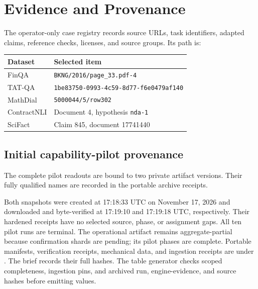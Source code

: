 \section{Evidence and Provenance}
\label{app:evidence}
The operator-only case registry records source URLs, task identifiers, adapted
claims, reference checks, licenses, and source groups. Its path is:
\begin{quote}\small
{}
\end{quote}
\begin{center}\small
\begin{tabular}{@{}l p{}@{}}
\toprule Dataset & Selected item\\
\midrule
FinQA & \texttt{BKNG/2016/page\_33.pdf-4}\\
TAT-QA & \nolinkurl{1be83750-0993-4c59-8d77-f6e0479af140}\\
MathDial & \texttt{5000044/5/row302}\\
ContractNLI & Document 4, hypothesis \texttt{nda-1}\\
SciFact & Claim 845, document 17741440\\
\bottomrule
\end{tabular}
\end{center}
\subsection{Initial capability-pilot provenance}
\label{app:pilot-locators}
The complete pilot readouts are bound to two private artifact versions. Their
fully qualified names are recorded in the portable archive receipts.
\begin{quote}\small
{}
\par\medskip
{}
\end{quote}
Both snapshots were created at 17:18:33 UTC on November 17, 2026 and downloaded
and byte-verified at 17:19:10 and 17:19:18 UTC, respectively. Their hardened
receipts have no selected source, phase, or assignment gaps. All ten pilot runs
are terminal. The operational artifact remains aggregate-partial because
confirmation shards are pending; its pilot phases are complete. Portable
manifests, verification receipts, mechanical data, and ingestion receipts are
under . The brief records their full
hashes. The table generator checks scoped completeness, ingestion pins, and
archived run, engine-evidence, and source hashes before emitting values.

